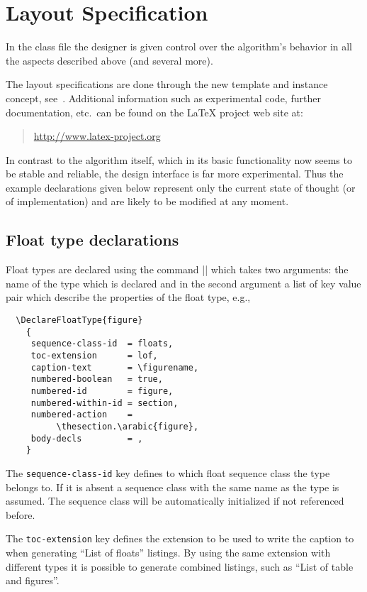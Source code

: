 \documentclass[twocolumn]{article}
\begin{document}
\section{Layout Specification}

In the class file the designer is given control over the algorithm's
behavior in all the aspects described above (and several more).

The layout specifications are done through the new template and
instance concept, see~\cite{tub:MCR99-3}. 
Additional information such as experimental code, further
documentation, etc.\ can
be found on the \LaTeX{} project web site at:
\begin{quote}
\url{http://www.latex-project.org}
\end{quote}

In contrast to the algorithm itself, which in its basic functionality
now seems to be stable and reliable, the design interface is far
more experimental. Thus the example declarations given below represent
only the current state of thought (or of implementation) 
and are likely to be modified at any moment.


\subsection{Float type declarations}

Float types are declared using the  command |\DeclareFloatType| which
takes two arguments: the name of the type which is declared and in the
second argument a list of key value pair which describe the
properties of the float type, e.g.,
\begin{verbatim}
  \DeclareFloatType{figure}
    {
     sequence-class-id  = floats,
     toc-extension      = lof,
     caption-text       = \figurename,
     numbered-boolean   = true,
     numbered-id        = figure,
     numbered-within-id = section,
     numbered-action    = 
          \thesection.\arabic{figure},
     body-decls         = ,
    }
\end{verbatim}
The \texttt{sequence-class-id} key defines to which float sequence
class the type belongs to. If it is absent a sequence class with the
same name as the type is assumed. The sequence class will be
automatically initialized if not referenced before.

The \texttt{toc-extension} key defines the extension to be used to
write the caption to when generating ``List of floats'' listings. By
using the same extension with different types it is possible to
generate combined listings, such as ``List of table and figures''.
\end{document}
